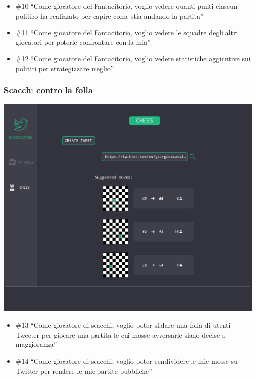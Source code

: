 \documentclass{article}
\begin{document}
\begin{itemize}
	\item \#10 ``Come giocatore del Fantacitorio, voglio vedere quanti punti ciascun
	      politico ha realizzato per capire come stia andando la partita''
	\item \#11 ``Come giocatore del Fantacitorio, voglio vedere le squadre degli altri
	      giocatori per poterle confrontare con la mia''
	\item \#12 ``Come giocatore del Fantacitorio, voglio vedere statistiche aggiuntive
	      sui politici per strategizzare meglio''
\end{itemize}

\subsubsection{Scacchi contro la folla}

\includegraphics[width=\textwidth]{mock-chess-moves}

\begin{itemize}
	\item \#13 ``Come giocatore di scacchi, voglio poter sfidare una folla di
	      utenti Tweeter per giocare una partita le cui mosse avversarie siano
	      decise a maggioranza''
	\item \#14 ``Come giocatore di scacchi, voglio poter condividere le mie mosse
	      su Twitter per rendere le mie partite pubbliche''
\end{itemize}
\end{document}

